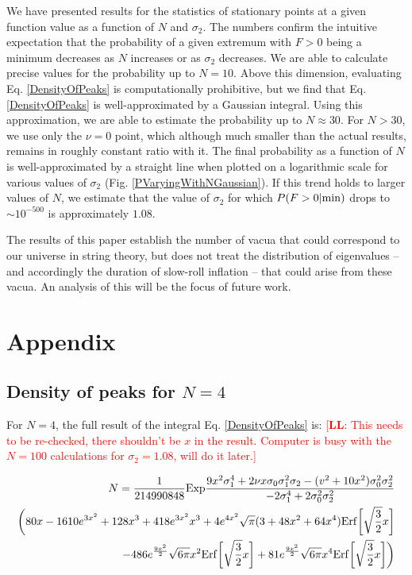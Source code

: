 \documentclass[12pt]{article}
\newcommand{\lfl}[1]{\textcolor{red}{[{\bf LL}: #1]}}
\begin{document}
We have presented results for the statistics of stationary points at a given function value as a function of $N$ and $\sigma_2$. The numbers confirm the intuitive expectation that the probability of a given extremum with $F > 0$ being a minimum decreases as $N$ increases or as $\sigma_2$ decreases. We are able to calculate precise values for the probability up to $N=10$. Above this dimension, evaluating Eq. \ref{DensityOfPeaks} is computationally prohibitive, but we find that Eq. \ref{DensityOfPeaks} is well-approximated by a Gaussian integral. Using this approximation, we are able to estimate the probability up to $N \approx 30$. For $N>30$, we use only the $\nu=0$ point, which although much smaller than the actual results, remains in roughly constant ratio with it. The final probability as a function of $N$ is well-approximated by a straight line when plotted on a logarithmic scale for various values of $\sigma_2$ (Fig. \ref{PVaryingWithNGaussian}). If this trend holds to larger values of $N$, we estimate that the value of $\sigma_2$ for which $P(F>0|{\rm min})$ drops to $\sim 10^{-500}$ is approximately $1.08$.

The results of this paper establish the number of vacua that could correspond to our universe in string theory, but does not treat the distribution of eigenvalues -- and accordingly the duration of slow-roll inflation -- that could arise from these vacua. An analysis of this will be the focus of future work.

\section{Appendix}
\subsection{Density of peaks for $N=4$} 
For $N=4$, the full result of the integral Eq. \ref{DensityOfPeaks} is: \lfl{This needs to be re-checked, there shouldn't be $x$ in the result. Computer is busy with the $N=100$ calculations for $\sigma_2=1.08$, will do it later.}

\begin{equation}
\begin{split}
N = \frac{1}{214990848} \mathrm{Exp}\frac{9x^2\sigma_1^4 + 2\nu x \sigma_0 \sigma_1^2 \sigma_2 - (v^2+10x^2)\sigma_0^2\sigma_2^2}{-2\sigma_1^4+2\sigma_0^2\sigma_2^2}\\\bigg{(}80x - 1610e^{3x^2}+128x^3+418e^{3x^2}x^3+4e^{4x^2}\sqrt{\pi}(3+48x^2+64x^4)\mathrm{Erf}\bigg{[}\sqrt{\frac{3}{2}}x\bigg{]}\\
-486e^{\frac{9x^2}{2}}\sqrt{6\pi}x^2\mathrm{Erf}\bigg{[}\sqrt{\frac{3}{2}}x\bigg{]}+81e^{\frac{9x^2}{2}}\sqrt{6\pi}x^4\mathrm{Erf}\bigg{[}\sqrt{\frac{3}{2}}x\bigg{]}\bigg{)}
\end{split}
\end{equation}
\end{document}
